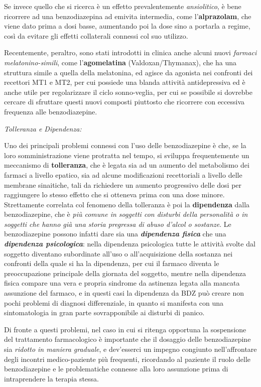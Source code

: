 \begin{itemize}
Se invece quello che si ricerca è un effetto prevalentemente
\emph{ansiolitico}, è bene ricorrere ad una benzodiazepina ad emivita
intermedia, come l'\textbf{alprazolam}, che viene dato prima a dosi
basse, aumentando poi la dose sino a portarla a regime, così da evitare
gli effetti collaterali connessi col suo utilizzo.

Recentemente, peraltro, sono stati introdotti in clinica anche alcuni
nuovi \emph{farmaci melatonino-simili}, come l'\textbf{agomelatina}
(Valdoxan/Thymanax), che ha una struttura simile a quella della
melatonina, ed agisce da agonista nei confronti dei recettori MT1 e MT2,
per cui possiede una blanda attività antidepressiva ed è anche utile per
regolarizzare il ciclo sonno-veglia, per cui se possibile si dovrebbe
cercare di sfruttare questi nuovi composti piuttosto che ricorrere con
eccessiva frequenza alle benzodiazepine.

\emph{\emph{Tolleranza e Dipendenza:}}

Uno dei principali problemi connessi con l'uso delle benzodiazepine è
che, se la loro somministrazione viene protratta nel tempo, si sviluppa
frequentemente un meccanismo di \textbf{tolleranza}, che è legata sia ad
un aumento del metabolismo dei farmaci a livello epatico, sia ad alcune
modificazioni recettoriali a livello delle membrane sinaitiche, tali da
richiedere un aumento progressivo delle dosi per raggiungere lo stesso
effetto che si otteneva prima con una dose minore. Strettamente
correlata col fenomeno della tolleranza è poi la \textbf{dipendenza}
dalla benzodiazepine, che è \emph{più comune in soggetti con disturbi
della personalità o in soggetti che hanno già una storia pregressa di
abuso d'alcol o sostanze}. Le benzodiazepine possono infatti dare sia
una \textbf{\emph{dipendenza fisica}} che una \textbf{\emph{dipendenza
psicologica}}: nella dipendenza psicologica tutte le attività svolte dal
soggetto diventano subordinate all'uso o all'acquisizione della sostanza
nei confronti della quale si ha la dipendenza, per cui il farmaco
diventa le preoccupazione principale della giornata del soggetto, mentre
nella dipendenza fisica compare una vera e propria sindrome da astinenza
legata alla mancata assunzione del farmaco, e in questi casi la
dipendenza da BDZ può creare non pochi problemi di diagnosi
differenziale, in quanto si manifesta con una sintomatologia in gran
parte sovrapponibile ai disturbi di panico.

Di fronte a questi problemi, nel caso in cui si ritenga opportuna la
sospensione del trattamento farmacologico è importante che il dosaggio
delle benzodiazepine sia \emph{ridotto in maniera graduale}, e
dev'esserci un impegno congiunto nell'affrontare degli incontri
medico-paziente più frequenti, ricordando al paziente il ruolo delle
benzodiazepine e le problematiche connesse alla loro assunzione prima di
intraprendere la terapia stessa.


\end{itemize}
